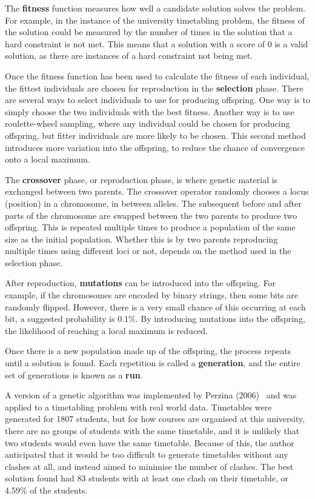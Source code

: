 \documentclass[a4paper, 12pt]{report}
\begin{document}
The \textbf{fitness} function measures how well a candidate solution solves the
problem.
For example, in the instance of the university timetabling problem, the fitness 
of the solution could be measured by the number of times in the solution that a
hard constraint is not met.
This means that a solution with a score of 0 is a valid solution, as there are
instances of a hard constraint not being met.

Once the fitness function has been used to calculate the fitness of each
individual, the fittest individuals are chosen for reproduction in the
\textbf{selection} phase.
There are several ways to select individuals to use for producing offspring.
One way is to simply choose the two individuals with the best fitness.
Another way is to use roulette-wheel sampling, where any individual could be
chosen for producing offspring, but fitter individuals are more likely to be
chosen.
This second method introduces more variation into the offspring, to reduce the
chance of convergence onto a local maximum.

The \textbf{crossover} phase, or reproduction phase, is where genetic material
is exchanged between two parents.
The crossover operator randomly chooses a locus (position) in a chromosome,
in between alleles.
The subsequent before and after parts of the chromosome are swapped between the
two parents to produce two offspring.
This is repeated multiple times to produce a population of the same size as the
initial population.
Whether this is by two parents reproducing multiple times using different loci
or not, depends on the method used in the selection phase.

After reproduction, \textbf{mutations} can be introduced into the offspring. 
For example, if the chromosomes are encoded by binary strings, then some bits 
are randomly flipped.
However, there is a very small chance of this occurring at each bit, a suggested
probability is 0.1\%.
By introducing mutations into the offspring, the likelihood of reaching a local
maximum is reduced.

Once there is a new population made up of the offspring, the process repeats 
until a solution is found.
Each repetition is called a \textbf{generation}, and the entire set of
generations is known as a \textbf{run}.

A version of a genetic algorithm was implemented by Perzina 
(2006)~\cite{ga_example} and was applied to a timetabling problem with real 
world data.
Timetables were generated for 1807 students, but for how courses are organised 
at this university, there are no groups of students with the same timetable, and
it is unlikely that two students would even have the same timetable.
Because of this, the author anticipated that it would be too difficult to
generate timetables without any clashes at all, and instead aimed to minimise
the number of clashes.
The best solution found had 83 students with at least one clash on their
timetable, or 4.59\% of the students.
\end{document}
